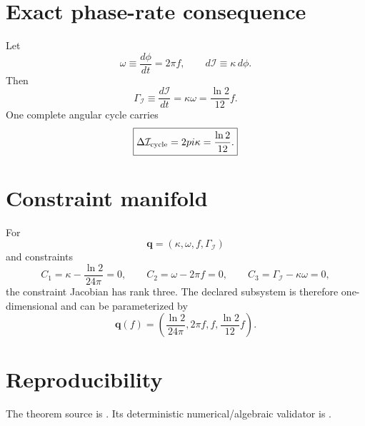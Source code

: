 \section{Exact phase-rate consequence}
Let
\[
\omega\equiv\frac{d\phi}{dt}=2\pi f,
\qquad
d\mathcal I\equiv\kappa\,d\phi.
\]
Then
\begin{equation}
\boxed{
\Gamma_{\mathcal I}
\equiv\frac{d\mathcal I}{dt}
=\kappa\omega
=\frac{\ln2}{12}f.
}
\label{eq:v12-kappa-phase-rate}
\end{equation}
One complete angular cycle carries
\begin{equation}
\boxed{
\Delta\mathcal I_{\rm cycle}
=2\pi\kappa
=\frac{\ln2}{12}.
}
\label{eq:v12-kappa-information-cycle}
\end{equation}

\section{Constraint manifold}
For
\[
\mathbf q=(\kappa,\omega,f,\Gamma_{\mathcal I})
\]
and constraints
\[
C_1=\kappa-\frac{\ln2}{24\pi}=0,
\qquad
C_2=\omega-2\pi f=0,
\qquad
C_3=\Gamma_{\mathcal I}-\kappa\omega=0,
\]
the constraint Jacobian has rank three.  The declared subsystem is therefore
one-dimensional and can be parameterized by
\begin{equation}
\boxed{
\mathbf q(f)=
\left(
\frac{\ln2}{24\pi},
2\pi f,
f,
\frac{\ln2}{12}f
\right).
}
\label{eq:v12-kappa-constraint-curve}
\end{equation}

\section{Reproducibility}
The theorem source is
.
Its deterministic numerical/algebraic validator is
.
